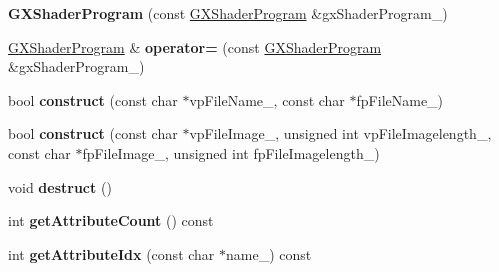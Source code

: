\begin{DoxyCompactItemize}
\item 
{\bfseries G\+X\+Shader\+Program} (const \hyperlink{class_i_dream_sky_1_1_g_x_shader_program}{G\+X\+Shader\+Program} \&gx\+Shader\+Program\+\_\+)\hypertarget{class_i_dream_sky_1_1_g_x_shader_program_ac0bcffc58d45d713798995d8707fa519}{}\label{class_i_dream_sky_1_1_g_x_shader_program_ac0bcffc58d45d713798995d8707fa519}

\item 
\hyperlink{class_i_dream_sky_1_1_g_x_shader_program}{G\+X\+Shader\+Program} \& {\bfseries operator=} (const \hyperlink{class_i_dream_sky_1_1_g_x_shader_program}{G\+X\+Shader\+Program} \&gx\+Shader\+Program\+\_\+)\hypertarget{class_i_dream_sky_1_1_g_x_shader_program_a619fa0944dfd2c143e873836785f1bda}{}\label{class_i_dream_sky_1_1_g_x_shader_program_a619fa0944dfd2c143e873836785f1bda}

\item 
bool {\bfseries construct} (const char $\ast$vp\+File\+Name\+\_\+, const char $\ast$fp\+File\+Name\+\_\+)\hypertarget{class_i_dream_sky_1_1_g_x_shader_program_afb3190844059fe35e2f53c03bfa9c65c}{}\label{class_i_dream_sky_1_1_g_x_shader_program_afb3190844059fe35e2f53c03bfa9c65c}

\item 
bool {\bfseries construct} (const char $\ast$vp\+File\+Image\+\_\+, unsigned int vp\+File\+Imagelength\+\_\+, const char $\ast$fp\+File\+Image\+\_\+, unsigned int fp\+File\+Imagelength\+\_\+)\hypertarget{class_i_dream_sky_1_1_g_x_shader_program_a0954dfc070ff0507e725ec6e5cfccea2}{}\label{class_i_dream_sky_1_1_g_x_shader_program_a0954dfc070ff0507e725ec6e5cfccea2}

\item 
void {\bfseries destruct} ()\hypertarget{class_i_dream_sky_1_1_g_x_shader_program_a5284df2ad380123eb00795812b7933af}{}\label{class_i_dream_sky_1_1_g_x_shader_program_a5284df2ad380123eb00795812b7933af}

\item 
int {\bfseries get\+Attribute\+Count} () const \hypertarget{class_i_dream_sky_1_1_g_x_shader_program_afdae36e0a1cbc7e56cc837309c50ba84}{}\label{class_i_dream_sky_1_1_g_x_shader_program_afdae36e0a1cbc7e56cc837309c50ba84}

\item 
int {\bfseries get\+Attribute\+Idx} (const char $\ast$name\+\_\+) const \hypertarget{class_i_dream_sky_1_1_g_x_shader_program_ab1b85ed737b8471a2d954212295759f7}{}\label{class_i_dream_sky_1_1_g_x_shader_program_ab1b85ed737b8471a2d954212295759f7}


\end{DoxyCompactItemize}
